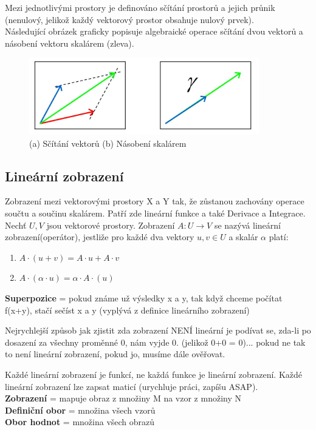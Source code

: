 \documentclass[10pt,a4paper]{article}
\begin{document}
Mezi jednotlivými prostory je definováno sčítání prostorů a jejich průnik (nenulový, jelikož každý vektorový prostor obsahuje nulový prvek).\\
Následující obrázek graficky popisuje algebraické operace sčítání dvou vektorů a násobení vektoru skalárem (zleva).
\begin{figure}[ht]
    \centering
    \includegraphics[width=10cm]{mat_vektory.JPG}
    \caption{(a) Sčítání vektorů (b) Násobení skalárem}
    \label{fig:mat_vektory}
\end{figure}

\subsection{Lineární zobrazení}
Zobrazení mezi vektorovými prostory X a Y tak, že zůstanou zachovány operace součtu a součinu skalárem. Patří zde lineární funkce a také Derivace a Integrace.\\
Nechť $U, V$ jsou vektorové prostory. Zobrazení $A:U\rightarrow V$ se nazývá lineární zobrazení(operátor), jestliže pro každé dva vektory $u,v \in U$ a skalár $\alpha$ platí:
\begin{enumerate}
    \item $A \cdot (u+v) = A\cdot u + A\cdot v$
    \item $A\cdot (\alpha \cdot u) = \alpha \cdot A \cdot (u)$ 
\end{enumerate}
\textbf{Superpozice} = pokud známe už výsledky x a y, tak když chceme počítat f(x+y), stačí sečíst x a y (vyplývá z definice lineárního zobrazení)\par
Nejrychlejší způsob jak zjistit zda zobrazení NENÍ lineární je podívat se, zda-li po dosazení za všechny proměnné 0, nám vyjde 0. (jelikož 0+0 = 0)... pokud ne tak to není lineární zobrazení, pokud jo, musíme dále ověřovat.\par
Každé lineární zobrazení je funkcí, ne každá funkce je lineární zobrazení. Každé lineární zobrazení lze zapsat maticí (urychluje práci, zapíšu ASAP).\\
\textbf{Zobrazení} = mapuje obraz z množiny M na vzor z množiny N\\
\textbf{Definiční obor} = množina všech vzorů\\
\textbf{Obor hodnot} = množina všech obrazů
\end{document}
